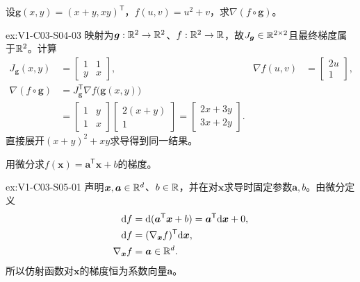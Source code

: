 \begin{SLChapterExercisePairSection}
\begin{exercise}[Jacobian链式法则]\label{ex:V1-C03-S04-03}
设$\boldsymbol g(x,y)=(x+y,xy)^{\mathsf T}$，$f(u,v)=u^2+v$，求$\nabla(f\circ\boldsymbol g)$。
\end{exercise}
\label{sol:V1-C03-S04-03}
\begin{chapterexercisesolution}{ex:V1-C03-S04-03}
映射为$\boldsymbol g:\mathbb{R}^2\to\mathbb{R}^2$、$f:\mathbb{R}^2\to\mathbb{R}$，故$J_{\boldsymbol g}\in\mathbb{R}^{2\times2}$且最终梯度属于$\mathbb{R}^2$。计算
\[
\begin{aligned}
J_{\boldsymbol g}(x,y)&=\begin{bmatrix}1&1\\y&x\end{bmatrix},
&\nabla f(u,v)&=\begin{bmatrix}2u\\1\end{bmatrix},\\
\nabla(f\circ\boldsymbol g)
&=J_{\boldsymbol g}^{\mathsf T}\nabla f\bigl(\boldsymbol g(x,y)\bigr)\\
&=\begin{bmatrix}1&y\\1&x\end{bmatrix}
\begin{bmatrix}2(x+y)\\1\end{bmatrix}
=\begin{bmatrix}2x+3y\\3x+2y\end{bmatrix}.
\end{aligned}
\]
直接展开$(x+y)^2+xy$求导得到同一结果。
\end{chapterexercisesolution}

\begin{exercise}[线性函数微分]\label{ex:V1-C03-S05-01}
用微分求$f(\boldsymbol{x})=\boldsymbol{a}^{\mathsf T}\boldsymbol{x}+b$的梯度。
\end{exercise}
\label{sol:V1-C03-S05-01}
\begin{chapterexercisesolution}{ex:V1-C03-S05-01}
声明$\boldsymbol x,\boldsymbol a\in\mathbb{R}^d$、$b\in\mathbb{R}$，并在对$\boldsymbol x$求导时固定参数$\boldsymbol a,b$。由微分定义
\[
\begin{aligned}
\mathrm df
&=\mathrm d(\boldsymbol a^{\mathsf T}\boldsymbol x+b)
=\boldsymbol a^{\mathsf T}\mathrm d\boldsymbol x+0,\\
\mathrm df&=(\nabla_{\boldsymbol x}f)^{\mathsf T}\mathrm d\boldsymbol x,\\
\nabla_{\boldsymbol x}f&=\boldsymbol a\in\mathbb{R}^d.
\end{aligned}
\]
所以仿射函数对$\boldsymbol x$的梯度恒为系数向量$\boldsymbol a$。
\end{chapterexercisesolution}


\end{SLChapterExercisePairSection}
